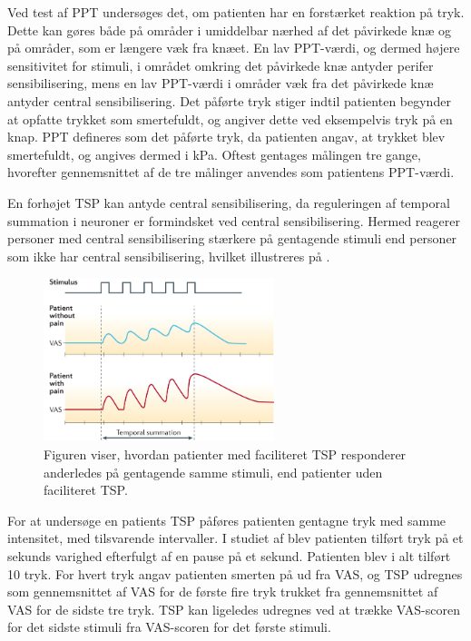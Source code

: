 Ved test af PPT undersøges det, om patienten har en forstærket reaktion på tryk. Dette kan gøres både på områder i umiddelbar nærhed af det påvirkede knæ og på områder, som er længere væk fra knæet. En lav PPT-værdi, og dermed højere sensitivitet for stimuli, i området omkring det påvirkede knæ antyder perifer sensibilisering, mens en lav PPT-værdi i områder væk fra det påvirkede knæ antyder central sensibilisering. \citep{Suokas2012} Det påførte tryk stiger indtil patienten begynder at opfatte trykket som smertefuldt, og angiver dette ved eksempelvis tryk på en knap. PPT defineres som det påførte tryk, da patienten angav, at trykket blev smertefuldt, og angives dermed i kPa. Oftest gentages målingen tre gange, hvorefter gennemsnittet af de tre målinger anvendes som patientens PPT-værdi. \citep{Petersen2015} \citep{Wylde2015b} 

En forhøjet TSP kan antyde central sensibilisering, da reguleringen af temporal summation i neuroner er formindsket ved central sensibilisering. \citep{Arendt-Nielsen2015b} Hermed reagerer personer med central sensibilisering stærkere på gentagende stimuli end personer som ikke har central sensibilisering, hvilket illustreres på . \citep{Arendt-Nielsen2015b} 

\begin{figure}[H] 
	\begin{center}
		\includegraphics[width=0.6\textwidth]{figures/dHTAanalyse/TSP_rask_syg.jpg}
	\end{center}
	\caption{Figuren viser, hvordan patienter med faciliteret TSP responderer anderledes på gentagende samme stimuli, end patienter uden faciliteret TSP. \citep{Reynolds2016}} 
	\label{fig:TSP_rask_syg} 
\end{figure} \vspace{-.25cm}

For at undersøge en patients TSP påføres patienten gentagne tryk med samme intensitet, med tilsvarende intervaller. I studiet af  blev patienten tilført tryk på et sekunds varighed efterfulgt af en pause på et sekund. Patienten blev i alt tilført 10 tryk. For hvert tryk angav patienten smerten på ud fra VAS, og TSP udregnes som gennemsnittet af VAS for de første fire tryk trukket fra gennemsnittet af VAS for de sidste tre tryk. \citep{Petersen2016} TSP kan ligeledes udregnes ved at trække VAS-scoren for det sidste stimuli fra VAS-scoren for det første stimuli. \citep{Petersen2015} 

